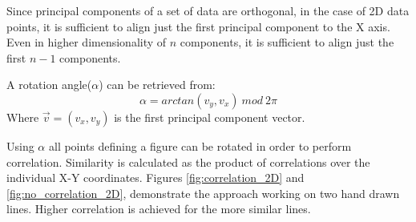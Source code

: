 \documentclass[11]{article}
\begin{document}
Since principal components of a set of data are orthogonal, in the case of 2D data points, it is sufficient to align just the first principal component to the X axis.
Even in higher dimensionality of $n$ components, it is sufficient to align just the first $n-1$ components.

A rotation angle($\alpha$) can be retrieved from:
\begin{equation*}
\alpha = arctan(v_y,v_x)\ mod\ 2\pi 
\end{equation*}
Where $\vec{v}=(v_x,v_y)$ is the first principal component vector.

Using $\alpha$ all points defining a figure can be rotated in order to perform correlation. 
Similarity is calculated as the product of correlations over the individual X-Y coordinates.
Figures \ref{fig:correlation_2D} and \ref{fig:no_correlation_2D}, demonstrate the approach working on two hand drawn lines. 
Higher correlation is achieved for the more similar lines. 
\end{document}
